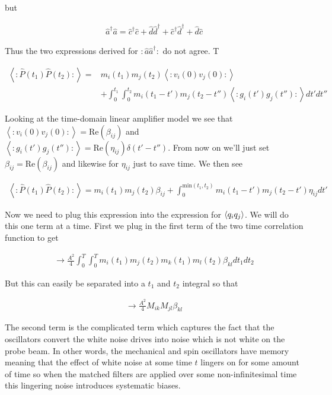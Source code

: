 \documentclass[12pt]{article}
\begin{document}
but

\begin{align}
\hat{a}^{\dag}\hat{a} = \hat{c}^{\dag}\hat{c}+\hat{d}\hat{d}^{\dag}+\hat{c}^{\dag}\hat{d}^{\dag}+\hat{d}\hat{c}
\end{align}

Thus the two expressions derived for $:\hat{a}\hat{a}^{\dag}:$ do not agree. T



\begin{align}
\left<:\hat{P}(t_1)\hat{P}(t_2):\right> = &m_i(t_1)m_j(t_2)\left<:v_i(0)v_j(0):\right> \\
& + \int_0^{t_1} \int_0^{t_2} m_i(t_1-t') m_j(t_2-t'') \left<:g_i(t')g_j(t''):\right> dt' dt''
\end{align}

Looking at the time-domain linear amplifier model we see that $\left<:v_i(0)v_j(0):\right> = \text{Re}(\beta_{ij})$ and $\left<:g_i(t')g_j(t''):\right> = \text{Re}(\eta_{ij})\delta(t'-t'')$. From now on we'll just set $\beta_{ij} = \text{Re}(\beta_{ij})$ and likewise for $\eta_{ij}$ just to save time. We then see

\begin{align}
\left<:\hat{P}(t_1)\hat{P}(t_2):\right> = m_i(t_1)m_j(t_2) \beta_{ij} + \int_0^{\text{min}(t_1,t_2)} m_i(t_1-t')m_j(t_2-t') \eta_{ij} dt'
\end{align}

Now we need to plug this expression into the expression for $\braket{q_iq_j}$. We will do this one term at a time. First we plug in the first term of the two time correlation function to get

\begin{align}
\rightarrow \frac{A^2}{4}\int_0^T\int_0^T m_i(t_1) m_j(t_2) m_k(t_1)m_l(t_2) \beta_{kl} dt_1 dt_2
\end{align}

But this can easily be separated into a $t_1$ and $t_2$ integral so that

\begin{align}
\rightarrow \frac{A^2}{4} M_{ik}M_{jl} \beta_{kl}
\end{align}

The second term is the complicated term which captures the fact that the oscillators convert the white noise drives into noise which is not white on the probe beam. In other words, the mechanical and spin oscillators have memory meaning that the effect of white noise at some time $t$ lingers on for some amount of time so when the matched filters are applied over some non-infinitesimal time this lingering noise introduces systematic biases.
\end{document}
